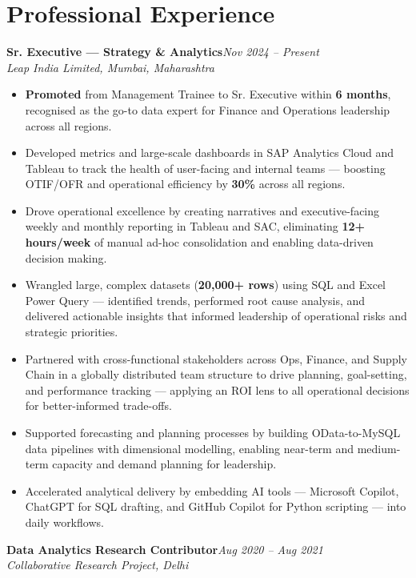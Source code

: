 \documentclass[10pt, letterpaper]{article}
\newcommand{\role}[3]{%
  \vspace{2pt}%
  {\bfseries #1}\hfill{\small\color{muted}\textit{#3}}\\[-2pt]%
  {\small\color{muted}\textit{#2}}%
}
\begin{document}
\section{Professional Experience}

\role{Sr. Executive — Strategy \& Analytics}{Leap India Limited, Mumbai, Maharashtra}{Nov 2024 – Present}

\begin{itemize}
  \item \textbf{Promoted} from Management Trainee to Sr. Executive within \textbf{6 months}, recognised as the go-to data expert for Finance and Operations leadership across all regions.
  \item Developed metrics and large-scale dashboards in SAP Analytics Cloud and Tableau to track the health of user-facing and internal teams — boosting OTIF/OFR and operational efficiency by \textbf{30\%} across all regions.
  \item Drove operational excellence by creating narratives and executive-facing weekly and monthly reporting in Tableau and SAC, eliminating \textbf{12+ hours/week} of manual ad-hoc consolidation and enabling data-driven decision making.
  \item Wrangled large, complex datasets (\textbf{20,000+ rows}) using SQL and Excel Power Query — identified trends, performed root cause analysis, and delivered actionable insights that informed leadership of operational risks and strategic priorities.
  \item Partnered with cross-functional stakeholders across Ops, Finance, and Supply Chain in a globally distributed team structure to drive planning, goal-setting, and performance tracking — applying an ROI lens to all operational decisions for better-informed trade-offs.
  \item Supported forecasting and planning processes by building OData-to-MySQL data pipelines with dimensional modelling, enabling near-term and medium-term capacity and demand planning for leadership.
  \item Accelerated analytical delivery by embedding AI tools — Microsoft Copilot, ChatGPT for SQL drafting, and GitHub Copilot for Python scripting — into daily workflows.
\end{itemize}

\vspace{1pt}

\role{Data Analytics Research Contributor}{Collaborative Research Project, Delhi}{Aug 2020 – Aug 2021}
\end{document}
